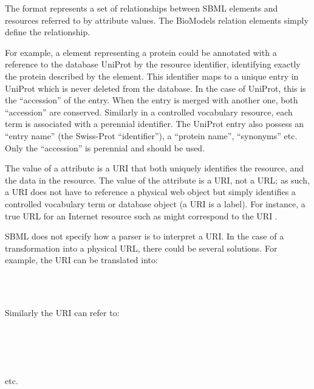 The format represents a set of relationships between SBML elements
and resources referred to by  attribute
values.  The BioModels relation elements simply define the 
relationship.

For example, a \Species element representing a protein could be
annotated with a reference to the database UniProt by the
 resource identifier,
identifying exactly the protein described by the \Species element.
This identifier maps to a unique entry in UniProt which is never
deleted from the database. In the case of UniProt, this is the
``accession'' of the entry. When the entry is merged with another
one, both ``accession'' are conserved. Similarly in a controlled
vocabulary resource, each term is associated with a perennial
identifier. The UniProt entry also possess an ``entry name'' (the
Swiss-Prot ``identifier''), a ``protein name'', ``synonyms'' etc.
Only the ``accession'' is perennial and should be used.

The value of a  attribute is a URI that both
uniquely identifies the resource, and the data in the resource. 
The value of the  attribute is a URI, not a
URL; as such, a URI does not have to reference a physical web
object but simply identifies a controlled vocabulary term or
database object (a URI is a label). For instance, a true URL for an Internet
resource such as  might
correspond to the URI .

SBML does not specify how a parser is to interpret a URI. In the
case of a transformation into a physical URL, there could be
several solutions. For example, the URI
 can be translated into:

\noindent {}\\
\noindent {}\\
\noindent {}

Similarly the URI  can refer to:

\noindent {}\\
\noindent {}\\
\noindent {}\\
\noindent {}\\[1ex]
\noindent etc.

